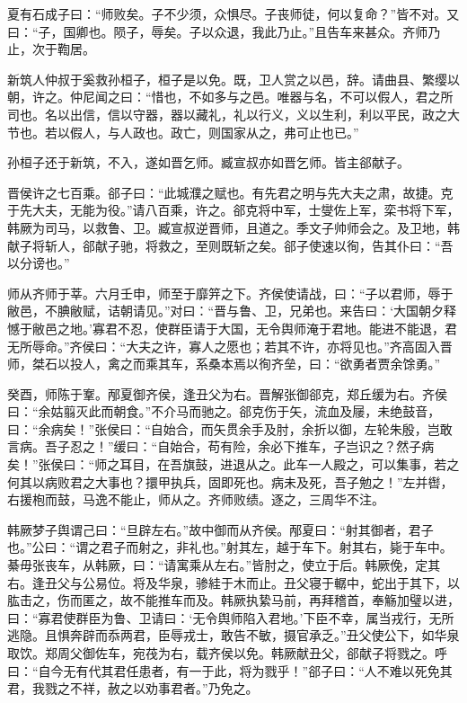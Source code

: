 \documentclass[a4paper,12pt,UTF8,twoside]{ctexbook}
\begin{document}
夏有石成子曰：“师败矣。子不少须，众惧尽。子丧师徒，何以复命？”皆不对。又曰：“子，国卿也。陨子，辱矣。子以众退，我此乃止。”且告车来甚众。齐师乃止，次于鞫居。

新筑人仲叔于奚救孙桓子，桓子是以免。既，卫人赏之以邑，辞。请曲县、繁缨以朝，许之。仲尼闻之曰：“惜也，不如多与之邑。唯器与名，不可以假人，君之所司也。名以出信，信以守器，器以藏礼，礼以行义，义以生利，利以平民，政之大节也。若以假人，与人政也。政亡，则国家从之，弗可止也已。”

孙桓子还于新筑，不入，遂如晋乞师。臧宣叔亦如晋乞师。皆主郤献子。

晋侯许之七百乘。郤子曰：“此城濮之赋也。有先君之明与先大夫之肃，故捷。克于先大夫，无能为役。”请八百乘，许之。郤克将中军，士燮佐上军，栾书将下军，韩厥为司马，以救鲁、卫。臧宣叔逆晋师，且道之。季文子帅师会之。及卫地，韩献子将斩人，郤献子驰，将救之，至则既斩之矣。郤子使速以徇，告其仆曰：“吾以分谤也。”

师从齐师于莘。六月壬申，师至于靡笄之下。齐侯使请战，曰：“子以君师，辱于敝邑，不腆敝赋，诘朝请见。”对曰：“晋与鲁、卫，兄弟也。来告曰：‘大国朝夕释憾于敝邑之地。’寡君不忍，使群臣请于大国，无令舆师淹于君地。能进不能退，君无所辱命。”齐侯曰：“大夫之许，寡人之愿也；若其不许，亦将见也。”齐高固入晋师，桀石以投人，禽之而乘其车，系桑本焉以徇齐垒，曰：“欲勇者贾余馀勇。”

癸酉，师陈于鞌。邴夏御齐侯，逢丑父为右。晋解张御郤克，郑丘缓为右。齐侯曰：“余姑翦灭此而朝食。”不介马而驰之。郤克伤于矢，流血及屦，未绝鼓音，曰：“余病矣！”张侯曰：“自始合，而矢贯余手及肘，余折以御，左轮朱殷，岂敢言病。吾子忍之！”缓曰：“自始合，苟有险，余必下推车，子岂识之？然子病矣！”张侯曰：“师之耳目，在吾旗鼓，进退从之。此车一人殿之，可以集事，若之何其以病败君之大事也？擐甲执兵，固即死也。病未及死，吾子勉之！”左并辔，右援枹而鼓，马逸不能止，师从之。齐师败绩。逐之，三周华不注。

韩厥梦子舆谓己曰：“旦辟左右。”故中御而从齐侯。邴夏曰：“射其御者，君子也。”公曰：“谓之君子而射之，非礼也。”射其左，越于车下。射其右，毙于车中。綦毋张丧车，从韩厥，曰：“请寓乘从左右。”皆肘之，使立于后。韩厥俛，定其右。逢丑父与公易位。将及华泉，骖絓于木而止。丑父寝于轏中，蛇出于其下，以肱击之，伤而匿之，故不能推车而及。韩厥执絷马前，再拜稽首，奉觞加璧以进，曰：“寡君使群臣为鲁、卫请曰：‘无令舆师陷入君地。’下臣不幸，属当戎行，无所逃隐。且惧奔辟而忝两君，臣辱戎士，敢告不敏，摄官承乏。”丑父使公下，如华泉取饮。郑周父御佐车，宛茷为右，载齐侯以免。韩厥献丑父，郤献子将戮之。呼曰：“自今无有代其君任患者，有一于此，将为戮乎！”郤子曰：“人不难以死免其君，我戮之不祥，赦之以劝事君者。”乃免之。
\end{document}

